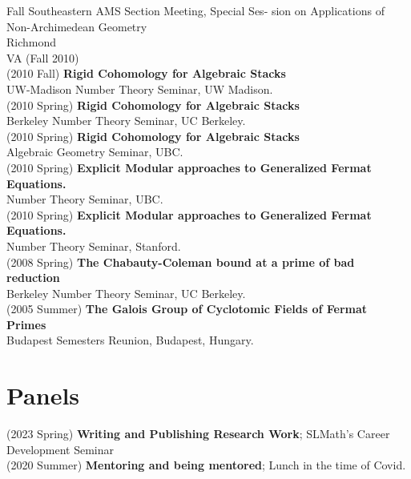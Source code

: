 \documentclass[margin,line]{res}
\begin{document}
\begin{resume}
Fall Southeastern AMS Section Meeting, Special Ses-
sion on Applications of Non-Archimedean Geometry\\ Richmond\\ VA (Fall 2010)
\vspace{.05cm}\\
(2010 Fall) \textbf{Rigid Cohomology for Algebraic Stacks}\\
 UW-Madison Number Theory Seminar, UW Madison.
\vspace{.05cm}\\
(2010 Spring) \textbf{Rigid Cohomology for Algebraic Stacks}\\
 Berkeley Number Theory Seminar, UC Berkeley.
\vspace{.05cm}\\
(2010 Spring) \textbf{Rigid Cohomology for Algebraic Stacks}\\
Algebraic Geometry Seminar, UBC.
\vspace{.05cm}\\
(2010 Spring) \textbf{Explicit Modular approaches to Generalized Fermat Equations.}\\
 Number Theory Seminar, UBC.
\vspace{.05cm}\\
(2010 Spring) \textbf{Explicit Modular approaches to Generalized Fermat Equations.}\\
 Number Theory Seminar, Stanford.
\vspace{.05cm}\\
(2008 Spring) \textbf{The Chabauty-Coleman bound at a prime of bad reduction}\\
 Berkeley Number Theory Seminar, UC Berkeley.
\vspace{.05cm}\\
(2005 Summer) \textbf{The Galois Group of Cyclotomic Fields of Fermat Primes}\\
Budapest Semesters Reunion, Budapest, Hungary. 
\vspace{.05cm}\\
  
  
\section{\sc Panels}
(2023 Spring) \textbf{ Writing and Publishing Research Work};
SLMath's Career Development Seminar
\vspace{.05cm}\\  
(2020 Summer) \textbf{Mentoring and being mentored};
Lunch in the time of Covid. 
\vspace{.05cm}\\


\end{resume}
\end{document}
